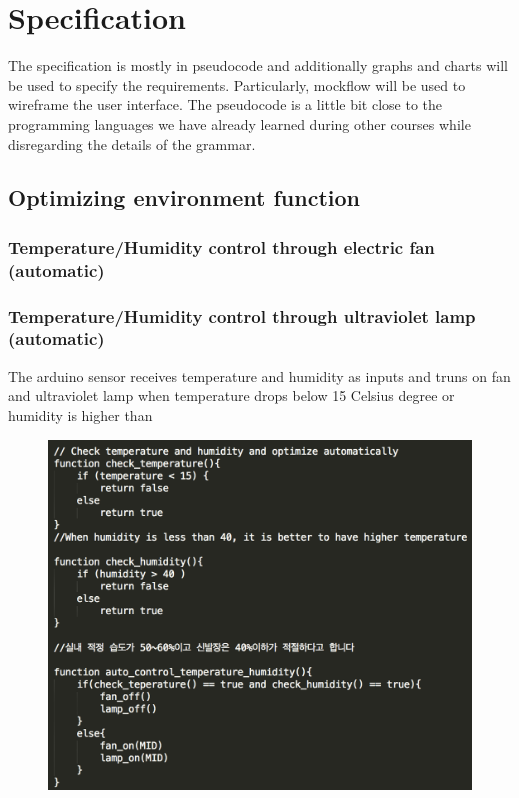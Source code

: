 \documentclass[conference]{IEEEtran}
\begin{document}
\section{Specification}
The specification is mostly in pseudocode and additionally graphs and charts will be used to specify the requirements. Particularly, mockflow will be used to wireframe the user interface. The pseudocode is a little bit close to the programming languages we have already learned during other courses while disregarding the details of the grammar.
\subsection{Optimizing environment function}
\subsubsection{Temperature/Humidity control through electric fan (automatic)}
\subsubsection{Temperature/Humidity control through ultraviolet lamp (automatic)}
The arduino sensor receives temperature and humidity as inputs and truns on fan and ultraviolet lamp when temperature drops below 15 Celsius degree or humidity is higher than 
\begin{figure}[h]
\begin{center}
    \includegraphics[scale=0.48]{optimization1}
    \label{fig:label}
\end{center}
\end{figure}
\end{document}
